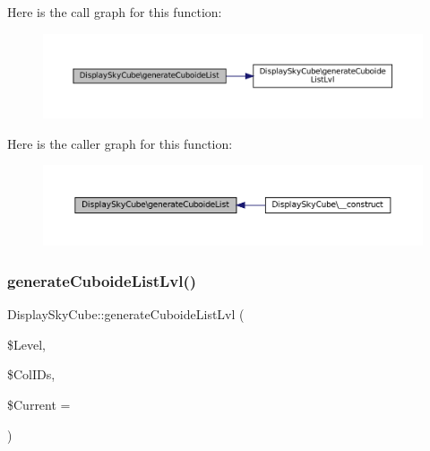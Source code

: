 Here is the call graph for this function\+:\nopagebreak
\begin{figure}[H]
\begin{center}
\leavevmode
\includegraphics[width=350pt]{class_display_sky_cube_a55b3623b8575c66eea925663fa771f7a_cgraph}
\end{center}
\end{figure}
Here is the caller graph for this function\+:\nopagebreak
\begin{figure}[H]
\begin{center}
\leavevmode
\includegraphics[width=350pt]{class_display_sky_cube_a55b3623b8575c66eea925663fa771f7a_icgraph}
\end{center}
\end{figure}
\mbox{\label{class_display_sky_cube_a13fd070a47a4e316504c87a125629128}} 
\subsubsection{\texorpdfstring{generate\+Cuboide\+List\+Lvl()}{generateCuboideListLvl()}}
{\footnotesize\ttfamily Display\+Sky\+Cube\+::generate\+Cuboide\+List\+Lvl (\begin{DoxyParamCaption}\item[{}]{\$\+Level,  }\item[{}]{\$\+Col\+I\+Ds,  }\item[{}]{\$\+Current = {\ttfamily \textquotesingle{}\textquotesingle{}} }\end{DoxyParamCaption})\hspace{0.3cm}{\ttfamily [protected]}}



